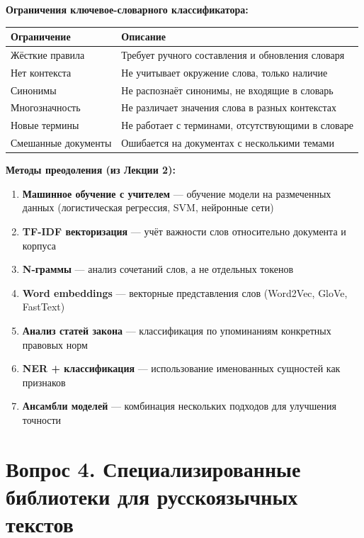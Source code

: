 \documentclass[12pt, a4paper]{report}
\begin{document}
\textbf{Ограничения ключевое-словарного классификатора:}

\begin{table}[h]
  \centering
  \begin{tabularx}{0.9\textwidth}{l X}
    \toprule
    \rowcolor{LightBlue}
    \textsf{\textbf{Ограничение}} & \textsf{\textbf{Описание}} \\
    \midrule
    Жёсткие правила & Требует ручного составления и обновления словаря \\
    Нет контекста & Не учитывает окружение слова, только наличие \\
    Синонимы & Не распознаёт синонимы, не входящие в словарь \\
    Многозначность & Не различает значения слова в разных контекстах \\
    Новые термины & Не работает с терминами, отсутствующими в словаре \\
    Смешанные документы & Ошибается на документах с несколькими темами \\
    \bottomrule
  \end{tabularx}
\end{table}

\textbf{Методы преодоления (из Лекции 2):}
\begin{enumerate}
  \item \textbf{Машинное обучение с учителем} — обучение модели на размеченных данных (логистическая регрессия, SVM, нейронные сети)
  \item \textbf{TF-IDF векторизация} — учёт важности слов относительно документа и корпуса
  \item \textbf{N-граммы} — анализ сочетаний слов, а не отдельных токенов
  \item \textbf{Word embeddings} — векторные представления слов (Word2Vec, GloVe, FastText)
  \item \textbf{Анализ статей закона} — классификация по упоминаниям конкретных правовых норм
  \item \textbf{NER + классификация} — использование именованных сущностей как признаков
  \item \textbf{Ансамбли моделей} — комбинация нескольких подходов для улучшения точности
\end{enumerate}

\section{Вопрос 4. Специализированные библиотеки для русскоязычных текстов}
\end{document}
